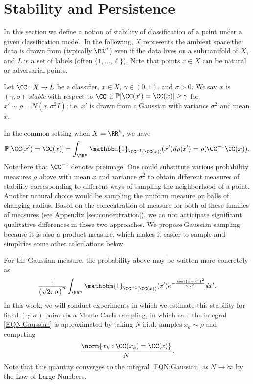 \section{Stability and Persistence} \label{sec:stab}
In this section we define a notion of stability of classification of a point under a given classification model. In the following, $X$ represents the ambient space the data is drawn from (typically $\RR^n$) even if the data lives on a submanifold of $X$, and $L$ is a set of labels (often $\{1,\dots,\ell\}$).  Note that points $x\in X$ can be natural or adversarial points.%

\begin{definition}
Let $\CC:X\to L$ be a classifier, $x \in X$, $\gamma\in(0,1)$, and $\sigma>0$. We say $x$ is \emph{$(\gamma,\sigma)$-stable} with respect to $\CC$ if $\mathbb{P}[\CC(x')=\CC(x)] \geq \gamma$ for $x' \sim \rho = N(x, \sigma^2 I)$; i.e. $x'$ is drawn from a Gaussian with variance $\sigma^2$ and mean $x$.
\end{definition}

In the common setting when $X=\RR^n$, we have
\[\mathbb{P}[\CC(x')=\CC(x)] = \int_{\RR^n} \mathbbm{1}_{\CC^{-1}(\CC(x))} (x') d\rho (x') = \rho(\CC^{-1}\CC(x)).\]
Note here that $\CC^{-1}$ denotes preimage. %
One could substitute various probability measures $\rho$ above with mean $x$ and variance $\sigma^2$ to obtain different measures of stability corresponding to different ways of sampling the neighborhood of a point.  Another natural choice would be sampling the uniform measure on balls of changing radius. Based on the concentration of measure for both of these families of measures (see Appendix \ref{sec:concentration}), we do not anticipate significant qualitative differences in these two approaches. We propose Gaussian sampling because it is also a product measure, which makes it easier to sample and simplifies some other calculations below.

For the Gaussian measure, the probability above may be written more concretely as
\begin{equation}\label{EQN:Gaussian}
\frac{1}{\left(\sqrt{2\pi}\sigma\right)^{n}} \int_{\RR^n} \mathbbm{1}_{\CC^{-1}(\CC(x))} (x')e^{-\frac{\norm{x - x'}^2}{2\sigma^2}} dx'.
\end{equation}
In this work, we will conduct experiments in which we estimate this stability for fixed $(\gamma,\sigma)$ pairs via a Monte Carlo sampling, in which case the integral \eqref{EQN:Gaussian} is approximated by taking $N$ i.i.d. samples $x_k \sim \rho$ and computing
\[
    \frac{\norm{x_k : \CC(x_k) = \CC(x)}}{N}.
\]
Note that this quantity converges to the integral \eqref{EQN:Gaussian} as $N\to\infty$ by the Law of Large Numbers.

